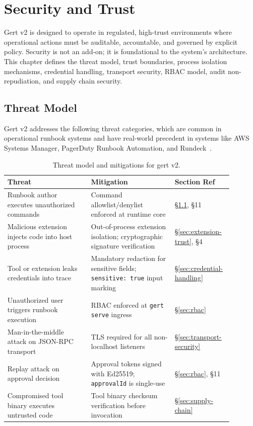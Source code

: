 \chapter{Security and Trust}
\label{ch:security}

Gert v2 is designed to operate in regulated, high-trust environments where
operational actions must be auditable, accountable, and governed by explicit
policy.  Security is not an add-on; it is foundational to the system's
architecture.  This chapter defines the threat model, trust boundaries,
process isolation mechanisms, credential handling, transport security, RBAC
model, audit non-repudiation, and supply chain security.

\section{Threat Model}
\label{sec:threat-model}

Gert v2 addresses the following threat categories, which are common in
operational runbook systems and have real-world precedent in systems like AWS
Systems Manager, PagerDuty Runbook Automation, and Rundeck~\cite{aws-ssm-runbooks,pagerduty-automation,rundeck-docs}.

\begin{table}[ht]
\centering
\begin{tabular}{p{0.35\linewidth}p{0.35\linewidth}p{0.20\linewidth}}
\hline
\textbf{Threat} & \textbf{Mitigation} & \textbf{Section Ref} \\
\hline
Runbook author executes unauthorized commands &
Command allowlist/denylist enforced at runtime core &
§\ref{sec:threat-model}, §11 \\
\hline
Malicious extension injects code into host process &
Out-of-process extension isolation; cryptographic signature verification &
§\ref{sec:extension-trust}, §4 \\
\hline
Tool or extension leaks credentials into trace &
Mandatory redaction for sensitive fields; \texttt{sensitive: true} input marking &
§\ref{sec:credential-handling} \\
\hline
Unauthorized user triggers runbook execution &
RBAC enforced at \texttt{gert serve} ingress &
§\ref{sec:rbac} \\
\hline
Man-in-the-middle attack on JSON-RPC transport &
TLS required for all non-localhost listeners &
§\ref{sec:transport-security} \\
\hline
Replay attack on approval decision &
Approval tokens signed with Ed25519; \texttt{approvalId} is single-use &
§\ref{sec:rbac}, §11 \\
\hline
Compromised tool binary executes untrusted code &
Tool binary checksum verification before invocation &
§\ref{sec:supply-chain} \\
\hline
\end{tabular}
\caption{Threat model and mitigations for gert v2.}
\label{tab:threat-model}
\end{table}

